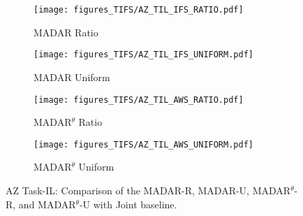 









\begin{figure}[!t]
    \centering
    \begin{subfigure}{0.45\linewidth}
        \centering
        \texttt{[image: figures\_TIFS/AZ\_TIL\_IFS\_RATIO.pdf]}
        \label{fig:AZ_TIL_IFS_R}
        \vspace{-0.4cm}
        \caption{MADAR Ratio}
    \end{subfigure}
    \hfill
    \begin{subfigure}{0.45\linewidth}
        \centering
        \texttt{[image: figures\_TIFS/AZ\_TIL\_IFS\_UNIFORM.pdf]}
        \label{fig:AZ_TIL_IFS_U}
        \vspace{-0.4cm}
        \caption{MADAR Uniform}
    \end{subfigure}
    \vfill
    \begin{subfigure}{0.45\linewidth}
        \centering
        \texttt{[image: figures\_TIFS/AZ\_TIL\_AWS\_RATIO.pdf]}
        \label{fig:AZ_TIL_AWS_R}
        \vspace{-0.4cm}
        \caption{MADAR$^\theta$ Ratio}
    \end{subfigure}
    \hfill
    \begin{subfigure}{0.45\linewidth}
        \centering
        \texttt{[image: figures\_TIFS/AZ\_TIL\_AWS\_UNIFORM.pdf]}
        \label{fig:AZ_TIL_AWS_U}
        \vspace{-0.4cm}
        \caption{MADAR$^\theta$ Uniform}
    \end{subfigure}

    \caption{AZ Task-IL: Comparison of the MADAR-R, MADAR-U, MADAR$^\theta$-R, and MADAR$^\theta$-U with Joint baseline.}
    \label{fig:az_TIL}
    \vspace{-0.3cm}
\end{figure}


